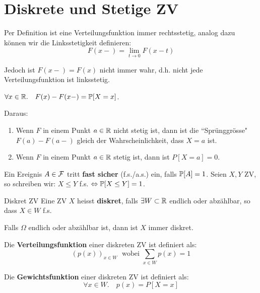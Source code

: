 \section*{Diskrete und Stetige ZV}

Per Definition ist eine Verteilungsfunktion immer rechtsstetig, analog dazu können wir die Linksstetigkeit definieren: 
$$F(x-) = \lim_{t \to 0} F(x-t)$$ 

Jedoch ist $F(x-) = F(x)$ nicht immer wahr, d.h. nicht jede Verteilungsfunktion ist linksstetig. \medskip

\begin{mainbox}{} $\forall x \in \mathbb{R}. \quad F(x) - F(x-) = \mathbb{P}[X = x]$.
\end{mainbox}
Daraus:
\begin{enumerate}
    \item Wenn $F$ in einem Punkt $a \in \mathbb{R}$ nicht stetig ist, dann ist die ``Sprünggrösse" $F(a) - F(a-)$ gleich der Wahrscheinlichkeit, dass $X = a$ ist.
    \item Wenn $F$ in einem Punkt $a \in \mathbb{R}$ stetig ist, dann ist $P[X = a] = 0$.
\end{enumerate}


Ein Ereignis $A \in \mathcal{F}$ tritt \textbf{fast sicher} (f.s./a.s.) ein, falls $\mathbb{P}[A] = 1$. Seien $X,Y$ ZV, so schreiben wir: $X \leq Y$ f.s. $\Leftrightarrow \mathbb{P}[X \leq Y] = 1$.



\begin{mainbox}{Diskret ZV}
    Eine ZV $X$ heisst \textbf{diskret}, falls $\exists W \subset \mathbb{R}$ endlich oder abzählbar, so dass $X \in W$ f.s. 
\end{mainbox}
\begin{subbox}{}
    Falls $\Omega$ endlich oder abzählbar ist, dann ist $X$ immer diskret.
\end{subbox}

\begin{mainbox}{}
Die \textbf{Verteilungsfunktion} einer diskreten ZV ist definiert als: 
$$(p(x))_{x \in W} \; \text{ wobei } \sum_{x \in W} p(x) = 1$$
\end{mainbox}
\begin{mainbox}{}
Die \textbf{Gewichtsfunktion} einer diskreten ZV ist definiert als: 
$$\forall x \in W. \quad p(x) = P[X = x]$$
\end{mainbox}


